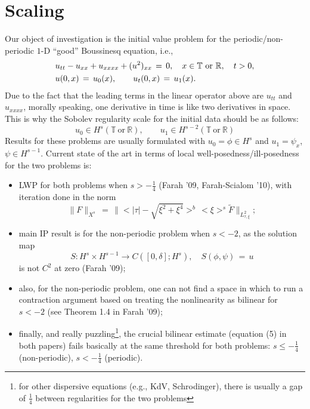 \documentclass[12pt,reqno]{amsart}
\numberwithin{equation}{section}  %
\begin{document}
%
%
%
%
%
%
%
%
%
%
%
%
%
\section{Scaling} 
\label{sec:scaling}
Our object of investigation is the initial value problem for the
periodic/non-periodic $1$-D ``good'' Boussinesq equation, i.e.,
\begin{equation}
  \aligned
  & u_{tt}-u_{xx}+u_{xxxx}+ (u^2)_{xx}\,=\,0, \quad x\in \mathbb{T}\ \text{or} \ \mathbb{R}, \quad t>0,\\
&u(0,x)\,=\,u_0(x),\qquad u_t(0,x)\,=\,u_1(x).\endaligned
\label{main}
\end{equation}
Due to the fact that the leading terms in the linear operator above are $u_{tt}$ and $u_{xxxx}$, morally speaking, one derivative in time is like two derivatives in space. This is why the Sobolev regularity scale for the initial data should be as follows:
\[
u_0\in H^s(\mathbb{T}\ \text{or} \ \mathbb{R}), \qquad u_1\in H^{s-2}(\mathbb{T}\ \text{or} \ \mathbb{R})
\]
Results for these problems are usually formulated with $u_0=\phi \in H^s$ and $u_1=\psi_x$, $\psi\in H^{s-1}$.
Current state of the art in terms of local well-posedness/ill-posedness for the two problems is:
\begin{itemize}
  \item LWP for both problems when $s>-\frac 14$ (Farah '09, Farah-Scialom '10), with iteration done in
    the norm
    \[
    \|F\|_{X^{s}}\,=\,\|<|\tau|-\sqrt{\xi^2+\xi^4}>^b\,<\xi>^s \tilde{F}\|_{L^2_{\tau,\xi}};
    \]
  \item main IP result is for the non-periodic problem when $s<-2$, as the solution map 
    \[
    S: H^s\times H^{s-1} \to C([0,\delta]; H^s), \quad
    S(\phi,\psi)\,=\,u
    \]
    is not $C^2$ at zero (Farah '09);
  \item also, for the non-periodic problem, one can not find a space in which to run a contraction argument based on treating the nonlinearity as bilinear for $s<-2$ (see Theorem 1.4 in Farah '09);
  \item finally, and really puzzling\footnote{for other dispersive equations (e.g., KdV, Schrodinger), there is usually a gap of $\frac 14$ between regularities for the two problems}, the crucial bilinear estimate (equation (5) in both papers) fails basically at the same threshold for both problems: $s\leq -\frac 14$ (non-periodic), $s<-\frac{1}{4}$ (periodic).
\end{itemize}
\end{document}
